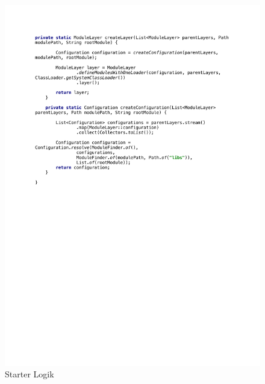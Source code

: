    \begin{figure}[]
      \centering
      \includegraphics[width=\textwidth]{material/images/appendix/mainB.pdf}
      \caption{Starter Logik}
      \label{fig:starterB}
    \end{figure}